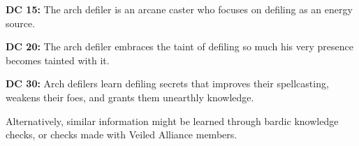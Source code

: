 \textbf{DC 15:} The arch defiler is an arcane caster who focuses on defiling as an energy source.

\textbf{DC 20:} The arch defiler embraces the taint of defiling so much his very presence becomes tainted with it.

\textbf{DC 30:} Arch defilers learn defiling secrets that improves their spellcasting, weakens their foes, and grants them unearthly knowledge.

Alternatively, similar information might be learned through bardic knowledge checks, or  checks made with Veiled Alliance members.